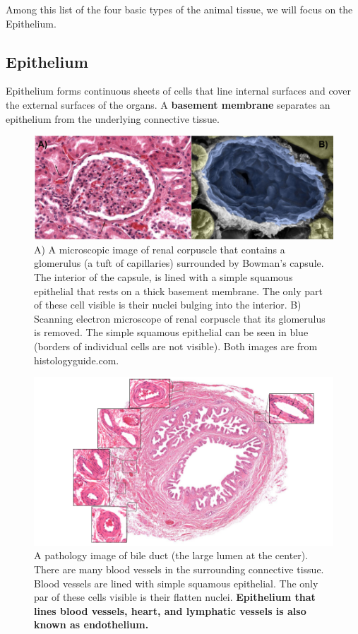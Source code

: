 Among this list of the four basic types of the animal tissue, we will focus on the Epithelium.

\subsection{Epithelium}
Epithelium forms continuous sheets of cells that line internal surfaces and cover the external surfaces of the organs. A \textbf{basement membrane} separates an epithelium from the underlying connective tissue. 


\begin{figure}[h!]
	\centering
	\includegraphics[width=0.8\linewidth]{images/histologySquamousEpithelial}
	\captionsetup{width=0.9\textwidth} 
	\caption{A) A microscopic image of renal corpuscle that contains a glomerulus (a tuft of capillaries) surrounded by Bowman's capsule. The interior of the capsule, is lined with a simple squamous epithelial that rests on a thick basement membrane. The only part of these cell visible is their nuclei bulging into the interior. B) Scanning electron microscope of renal corpuscle that its glomerulus is removed. The simple squamous epithelial can be seen in blue (borders of individual cells are not visible). Both images are from histologyguide.com.   }
	\label{fig:histologysquamousepithelial}
\end{figure}
\FloatBarrier

\begin{figure}[h!]
	\centering
	\includegraphics[width=0.8\linewidth]{images/bileDuct-SquamousEpithelialCells.png}
	\captionsetup{width=0.9\textwidth} 
	\caption{A pathology image of bile duct (the large lumen at the center). There are many blood vessels in the surrounding connective tissue. Blood vessels are lined with simple squamous epithelial. The only par of these cells visible is their flatten nuclei. \textbf{Epithelium that lines blood vessels, heart, and lymphatic vessels is also known as endothelium.}}

\end{figure}


